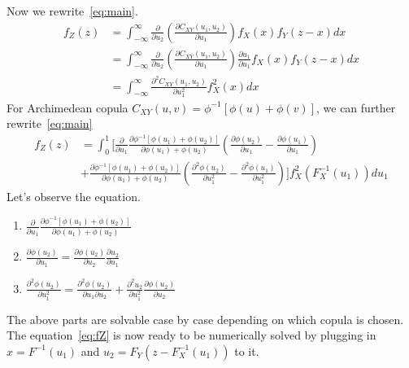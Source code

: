 \documentclass[11pt, leqno]{article}
\numberwithin{equation}{section}
\begin{document}
    Now we rewrite~\ref{eq:main}.
    \begin{align}
            f_{Z}(z) &= \int^\infty_{-\infty}
    \frac{\partial }{\partial u_2}
        \left(   \frac{\partial C_{XY}(u_1, u_2)}
         {\partial u_1}   \right)
            f_X(x)f_Y(z-x)dx\\
              &= \int^\infty_{-\infty}
    \frac{\partial }{\partial u_2}
        \left(   \frac{\partial C_{XY}(u_1, u_2)}
         {\partial u_1}   \right)\frac{\partial u_1}{\partial u_1}
            f_X(x)f_Y(z-x)dx\\
        &= \int^\infty_{-\infty} \frac{\partial^2 C_{XY}(u_1, u_2)}{\partial u_1^2} f^2_X(x)dx
    \end{align}
    For Archimedean copula $C_{XY}(u,v) = \phi^{-1}[\phi(u)+\phi(v)]$, we can further rewrite~\ref{eq:main}
        \begin{align}
            f_{Z}(z) &=
            \int^1_0 \bigg [
            \frac{\partial}{\partial u_1}
            \frac{\partial \phi^{-1}[\phi(u_1)+\phi(u_2)]}{\partial \phi(u_1)+\phi(u_2)}
            \left(
            \frac{\partial \phi(u_2)}{\partial u_1}-
            \frac{\partial \phi(u_1)}{\partial u_1}
            \right)
            \nonumber \\
            \qquad & +\frac{\partial \phi^{-1}[\phi(u_1)+\phi(u_2)]}{\partial \phi(u_1)+\phi(u_2)}
            \left(
            \frac{\partial^2 \phi(u_2)}{\partial u_1^2}-
            \frac{\partial^2 \phi(u_1)}{\partial u_1^2}
            \right)
            \bigg ]f^2_X(F^{-1}_X(u_1))du_1 \label{eq:fZ}
    \end{align}
    Let's observe the equation.
    \begin{enumerate}
    \item $\frac{\partial}{\partial u_1}
            \frac{\partial \phi^{-1}[\phi(u_1)+\phi(u_2)]}{\partial \phi(u_1)+\phi(u_2)}$
    \item $\frac{\partial \phi(u_2)}{\partial u_1} = \frac{\partial \phi(u_2)}{\partial u_2}\frac{\partial u_2}{\partial u_1}$
    \item $\frac{\partial^2 \phi(u_2)}{\partial u_1^2} = \frac{\partial^2 \phi(u_2)}{\partial u_1 \partial u_2}+
    \frac{\partial^2 u_2}{\partial u_1^2}\frac{\partial \phi(u_2)}{\partial u_2}$
    \end{enumerate}
    The above parts are solvable case by case depending on which copula is chosen.
    The equation~\ref{eq:fZ} is now ready to be numerically solved by plugging in $x=F^{-1}(u_1)$ and $u_2 = F_Y(z-F^{-1}_X(u_1))$ to it.
\end{document}
